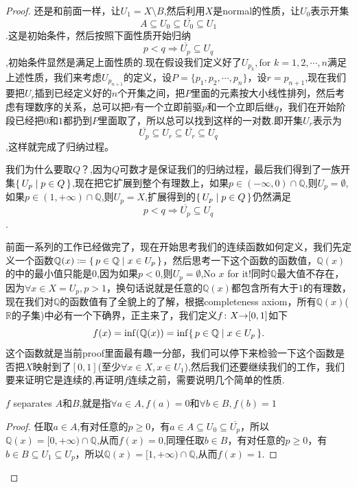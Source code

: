 \begin{proof}
还是和前面一样，让$U_1 = X \setminus B$,然后利用$X$是normal的性质，让$U_0$表示开集\[A \subseteq U_0 \subseteq \overline{U_0} \subseteq U_1\].这是初始条件，然后按照下面性质开始归纳\[p < q \Rightarrow \overline{U_p} \subseteq {U_q}\],初始条件显然是满足上面性质的.现在假设我们定义好了$U_{p_k},\text{for } k=1,2,\cdots,n$满足上述性质，我们来考虑$U_{p_{n+1}}$的定义，设$P=\{p_1,p_2,\cdots,p_n\}$，设$r = p_{n+1}$,现在我们要把$U_r$插到已经定义好的$n$个开集之间，把$P$里面的元素按大小线性排列，然后考虑有理数序的关系，总可以把$r$有一个立即前驱$p$和一个立即后继$q$，我们在开始阶段已经把$0$和$1$都扔到$P$里面取了，所以总可以找到这样的一对数.即开集$U_r$表示为\[\overline{U_p} \subseteq U_r \subseteq \overline{U_r} \subseteq U_q\],这样就完成了归纳过程。

我们为什么要取$Q$？,因为$Q$可数才是保证我们的归纳过程，最后我们得到了一族开集$\{\,U_p\mid p \in Q\,\}$,现在把它扩展到整个有理数上，如果$p \in (-\infty,0) \cap \mathbb{Q}$,则$U_p=\emptyset$,如果$p \in (1,+\infty) \cap \mathbb{Q}$,则$U_p = X$,扩展得到的$\{\,U_p\mid p \in Q\,\}$仍然满足\[p < q \Rightarrow \overline{U_p} \subseteq {U_q}\].

前面一系列的工作已经做完了，现在开始思考我们的连续函数如何定义，我们先定义一个函数$\mathbb{Q}(x) \coloneqq \{\,p \in \mathbb{Q}\mid x \in U_p\,\}$，然后思考一下这个函数的函数值，$\mathbb{Q}(x)$的中的最小值只能是$0$,因为如果$p < 0$,则$U_p = \emptyset$,No $x$ for it!同时$\mathbb{Q}$最大值不存在，因为$\forall x \in X=U_p,p>1$，换句话说就是任意的$\mathbb{Q}(x)$都包含所有大于$1$的有理数，现在我们对$\mathbb{Q}$的函数值有了全貌上的了解，根据completeness axiom，所有$\mathbb{Q}(x)$($\mathbb{R}$的子集)中必有一个下确界，正主来了，我们定义${f}\colon{X}{\to}{[0,1]}$如下\[f(x) = \inf(\mathbb{Q}(x)) = \inf\{\,p \in \mathbb{Q}\mid x \in U_p\,\}.\]这个函数就是当前proof里面最有趣一分部，我们可以停下来检验一下这个函数是否把$X$映射到了$[0,1]$(至少$\forall x \in X,x \in U_1$),然后我们还要继续我们的工作，我们要来证明它是连续的,再证明$f$连续之前，需要说明几个简单的性质.
\begin{claim}
$f$ separates $A$和$B$,就是指$\forall a \in A, f(a)=0$和$\forall b \in B, f(b) = 1$
\end{claim}

\begin{proof}
任取$a \in A$,有对任意的$p \geq 0$，有$a \in A \subseteq U_0 \subseteq \overline{U_p}$，所以$\mathbb{Q}(x) = [0,+\infty) \cap \mathbb{Q}$,从而$f(x)=0$,同理任取$b \in B$，有对任意的$p \geq 0$，有$b \in B \subseteq U_1 \subseteq U_p$，所以$\mathbb{Q}(x) = [1,+\infty) \cap \mathbb{Q}$,从而$f(x)=1$.
\end{proof}


\end{proof}
